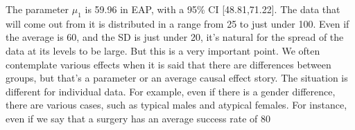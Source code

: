 \documentclass{ltjsbook}
\begin{document}
The parameter $\mu_1$ is 59.96 in EAP, with a 95\% CI [48.81,71.22]. The data that will come out from it is distributed in a range from 25 to just under 100. Even if the average is 60, and the SD is just under 20, it's natural for the spread of the data at its levels to be large. But this is a very important point. We often contemplate various effects when it is said that there are differences between groups, but that's a parameter or an average causal effect story. The situation is different for individual data. For example, even if there is a gender difference, there are various cases, such as typical males and atypical females. For instance, even if we say that a surgery has an average success rate of 80%
\end{document}
